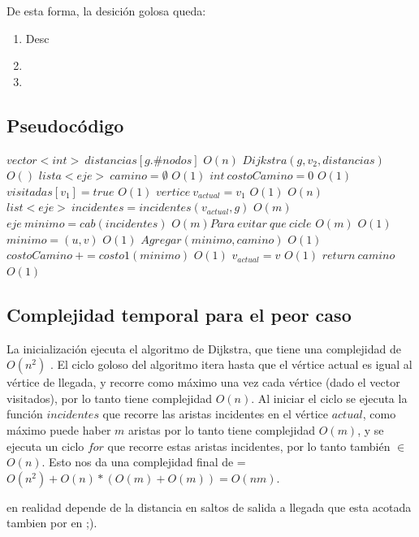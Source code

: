 \vspace{2mm}

De esta forma, la desici\'on golosa queda:

\begin{enumerate}
\item Desc 
\item 
\item 
\end{enumerate}



\subsection{Pseudoc\'odigo}


\begin{algorithmic}


\State $vector<int> \: distancias[g.\#nodos]$
\Comment $ O(n) $
\State $ Dijkstra( g, v_2, distancias) $
\Comment $ O() $
\State $lista<eje> \: camino= \emptyset$
\Comment $ O(1) $
\State $ int \: costoCamino = 0 $
\Comment $ O(1) $
\State $ visitadas[v_1] = true $
\Comment $ O(1) $
\State $ vertice \: v_{actual} = v_1 $
\Comment $ O(1) $
\Comment $ O(n) $
	\State $ list<eje> \: incidentes = incidentes(v_{actual}, g) $
	\Comment $ O(m) $
	\State $ eje \:	 minimo = cab(incidentes) $
	\Comment $ O(m) Para\: evitar \:que \:cicle $
	\Comment $ O(m) $
		\Comment $ O(1) $
			\State $ minimo = (u,v) $
			\Comment $ O(1) $
		\EndIf
	\EndFor
	\State $ Agregar(minimo, camino) $
	\Comment $ O(1) $
	\State $ costoCamino \: += costo1(minimo) $
	\Comment $ O(1) $
	\State $ v_{actual} = v $
	\Comment $ O(1) $
\EndWhile
\State $ return \: camino $
\Comment $ O(1) $

\EndProcedure

\end{algorithmic}




\subsection{Complejidad temporal para el peor caso}

La inicializaci\'on ejecuta el algoritmo de Dijkstra, que tiene una complejidad de $O(n^2)$ . El ciclo goloso del algoritmo itera hasta que el v\'ertice actual es igual al v\'ertice de llegada, y recorre como m\'aximo una vez cada v\'ertice (dado el vector visitados), por lo tanto tiene complejidad $O(n)$. Al iniciar el ciclo se ejecuta la funci\'on $incidentes$ que recorre las aristas incidentes en el v\'ertice $actual$, como m\'aximo puede haber $m$ aristas por lo tanto tiene complejidad $O(m)$, y se ejecuta un ciclo $for$ que recorre estas aristas incidentes, por lo tanto tambi\'en $\in$ $O(n)$. Esto nos da una complejidad final de = $ O(n^2)+ O(n)*(O(m)+O(m)) = O(nm)$. 

en realidad depende de la distancia en saltos de salida a llegada que esta acotada tambien por en ;).